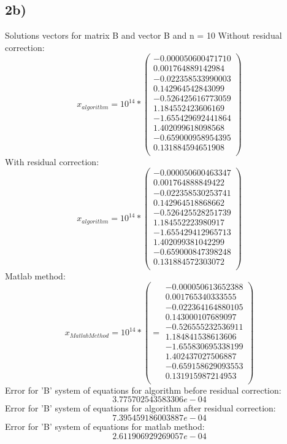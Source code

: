 \subsection{2b)}
Solutions vectors for matrix B and vector B and n = 10
Without residual correction:
\[ x_{algorithm} = 10^{14} * \left(\begin{array}{cc}
-0.000050600471710 \\
 0.001764889142984 \\
-0.022358533990003 \\
 0.142964542843099 \\
-0.526425616773059 \\
 1.184552423606169 \\
-1.655429692441864 \\
 1.402099618098568 \\
-0.659000958954395 \\
 0.131884594651908 \\
\end{array} \right)
\]
With residual correction:
\[ x_{algorithm} = 10^{14} * \left(\begin{array}{cc}
-0.000050600463347 \\
 0.001764888849422 \\
-0.022358530253741 \\
 0.142964518868662 \\
-0.526425528251739 \\
 1.184552223980917 \\
-1.655429412965713 \\
 1.402099381042299 \\
-0.659000847398248 \\
 0.131884572303072 \\
\end{array} \right)
\]
Matlab method:
\[
x_{Matlab Method} = 10^{14} * \left(  = \begin{array}{cc}
-0.000050613652388 \\
0.001765340333555 \\
-0.022364164880105 \\
0.143000107689097 \\
-0.526555232536911 \\
1.184841538613606 \\
-1.655830695338199 \\
1.402437027506887 \\
-0.659158629093553 \\
0.131915987214953 \\
\end{array} \right)
\]
Error for 'B' system of equations for algorithm before residual correction: \[ 3.775702543583306e-04 \]
Error for 'B' system of equations for algorithm after residual correction: \[ 7.395459186003887e-04 \]
Error for 'B' system of equations for matlab method: \[ 2.611906929269057e-04 \]

\newpage

